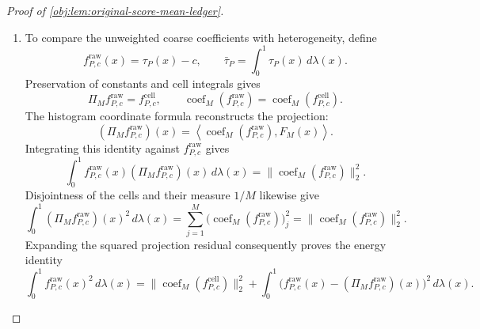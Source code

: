\begin{proof}[Proof of \cref{obj:lem:original-score-mean-ledger}]
\begin{enumerate}
Define the coarse-cell average weights by
\[
\bar w_{j,M}
=
M\int_{I_{j,M}}w_K(x)\,d\lambda(x),
\qquad j\in\{1,\ldots,M\}.
\]
The function \(f^{\mathrm{cell}}_{P,c}\) is constant on each coarse cell, so the coordinate formula gives
\[
\bigl(\theta^{\mathrm{cell}}_P(c)\bigr)_j
=
\bar w_{j,M}
\bigl(\operatorname{coef}_M(f^{\mathrm{cell}}_{P,c})\bigr)_j,
\qquad
\bar w_{j,M}\ge\frac3{16}.
\]
Squaring and summing proves
\[
\|\theta^{\mathrm{cell}}_P(c)\|_2^2
\ge
\left(\frac3{16}\right)^2
\|\operatorname{coef}_M(f^{\mathrm{cell}}_{P,c})\|_2^2,
\]
and therefore
\[
\|\theta^{\mathrm{cell}}_P(c)\|_2
\ge
\frac3{16}
\|\operatorname{coef}_M(f^{\mathrm{cell}}_{P,c})\|_2.
\]
The effect cap in \cref{obj:ass:effect-cap} also gives the bounds used to integrate these vectors:
\[
|\Pi_M\tau_P|\le\frac12,
\qquad
|f^{\mathrm{cell}}_{P,c}|\le1,
\qquad
|\tau_P-c|\le1.
\]

\item
To compare the unweighted coarse coefficients with heterogeneity, define
\[
f^{\mathrm{raw}}_{P,c}(x)=\tau_P(x)-c,
\qquad
\bar\tau_P=\int_0^1\tau_P(x)\,d\lambda(x).
\]
Preservation of constants and cell integrals gives
\[
\Pi_Mf^{\mathrm{raw}}_{P,c}=f^{\mathrm{cell}}_{P,c},
\qquad
\operatorname{coef}_M(f^{\mathrm{raw}}_{P,c})
=
\operatorname{coef}_M(f^{\mathrm{cell}}_{P,c}).
\]
The histogram coordinate formula reconstructs the projection:
\[
(\Pi_Mf^{\mathrm{raw}}_{P,c})(x)
=
\left\langle
\operatorname{coef}_M(f^{\mathrm{raw}}_{P,c}),F_M(x)
\right\rangle.
\]
Integrating this identity against \(f^{\mathrm{raw}}_{P,c}\) gives
\[
\int_0^1
f^{\mathrm{raw}}_{P,c}(x)(\Pi_Mf^{\mathrm{raw}}_{P,c})(x)\,d\lambda(x)
=
\|\operatorname{coef}_M(f^{\mathrm{raw}}_{P,c})\|_2^2.
\]
Disjointness of the cells and their measure \(1/M\) likewise give
\[
\int_0^1(\Pi_Mf^{\mathrm{raw}}_{P,c})(x)^2\,d\lambda(x)
=
\sum_{j=1}^M
\bigl(\operatorname{coef}_M(f^{\mathrm{raw}}_{P,c})\bigr)_j^2
=
\|\operatorname{coef}_M(f^{\mathrm{raw}}_{P,c})\|_2^2.
\]
Expanding the squared projection residual consequently proves the energy identity
\[
\int_0^1f^{\mathrm{raw}}_{P,c}(x)^2\,d\lambda(x)
=
\|\operatorname{coef}_M(f^{\mathrm{cell}}_{P,c})\|_2^2
+
\int_0^1
\bigl(f^{\mathrm{raw}}_{P,c}(x)-(\Pi_Mf^{\mathrm{raw}}_{P,c})(x)\bigr)^2
\,d\lambda(x).
\]


\end{enumerate}
\end{proof}
